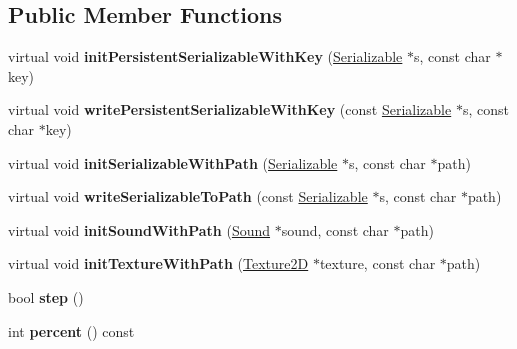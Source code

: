 \subsection*{Public Member Functions}
\begin{DoxyCompactItemize}
\item 
\hypertarget{classg2c_1_1_asynchronous_bank_afab7285f8e1791e41abd6616832efe01}{
virtual void {\bfseries initPersistentSerializableWithKey} (\hyperlink{classg2c_1_1_serializable}{Serializable} $\ast$s, const char $\ast$key)}
\label{classg2c_1_1_asynchronous_bank_afab7285f8e1791e41abd6616832efe01}

\item 
\hypertarget{classg2c_1_1_asynchronous_bank_ade98f9613a837c61a16ce801c8b8c8c3}{
virtual void {\bfseries writePersistentSerializableWithKey} (const \hyperlink{classg2c_1_1_serializable}{Serializable} $\ast$s, const char $\ast$key)}
\label{classg2c_1_1_asynchronous_bank_ade98f9613a837c61a16ce801c8b8c8c3}

\item 
\hypertarget{classg2c_1_1_asynchronous_bank_a45885d8428311718d15dbad91108192f}{
virtual void {\bfseries initSerializableWithPath} (\hyperlink{classg2c_1_1_serializable}{Serializable} $\ast$s, const char $\ast$path)}
\label{classg2c_1_1_asynchronous_bank_a45885d8428311718d15dbad91108192f}

\item 
\hypertarget{classg2c_1_1_asynchronous_bank_a671b5a907bd57ff8220af43d2abf79ac}{
virtual void {\bfseries writeSerializableToPath} (const \hyperlink{classg2c_1_1_serializable}{Serializable} $\ast$s, const char $\ast$path)}
\label{classg2c_1_1_asynchronous_bank_a671b5a907bd57ff8220af43d2abf79ac}

\item 
\hypertarget{classg2c_1_1_asynchronous_bank_ac0e1ec52f0bd4d38055bacb5e40bfece}{
virtual void {\bfseries initSoundWithPath} (\hyperlink{classg2c_1_1_sound}{Sound} $\ast$sound, const char $\ast$path)}
\label{classg2c_1_1_asynchronous_bank_ac0e1ec52f0bd4d38055bacb5e40bfece}

\item 
\hypertarget{classg2c_1_1_asynchronous_bank_ac7e1a291f4e9bb90d2579378c1519ead}{
virtual void {\bfseries initTextureWithPath} (\hyperlink{classg2c_1_1_texture2_d}{Texture2D} $\ast$texture, const char $\ast$path)}
\label{classg2c_1_1_asynchronous_bank_ac7e1a291f4e9bb90d2579378c1519ead}

\item 
\hypertarget{classg2c_1_1_asynchronous_bank_aa827f39fdf7e9cfd406cbb7c614d84a8}{
bool {\bfseries step} ()}
\label{classg2c_1_1_asynchronous_bank_aa827f39fdf7e9cfd406cbb7c614d84a8}

\item 
\hypertarget{classg2c_1_1_asynchronous_bank_ac010830c5098537586acd686caaa1f7c}{
int {\bfseries percent} () const }
\label{classg2c_1_1_asynchronous_bank_ac010830c5098537586acd686caaa1f7c}

\end{DoxyCompactItemize}
